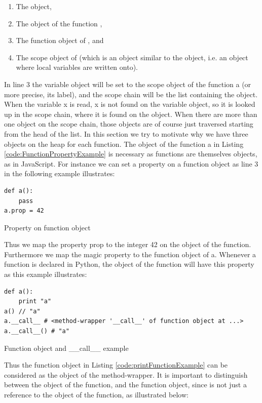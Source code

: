 \begin{enumerate}
  \item The  object,
  \item The object of the function ,
  \item The function object of , and
  \item The scope object of  (which is an object similar to the  object, i.e. an object where local variables are written onto).
\end{enumerate}
In line 3 the variable object will be set to the scope object of the function a (or more precise, its label), and the scope chain will be the list containing the  object. When the variable x is read, x is not found on the variable object, so it is looked up in the scope chain, where it is found on the  object. When there are more than one object on the scope chain, those objects are of course just traversed starting from the head of the list.
In this section we try to motivate why we have three objects on the heap for each function. The object of the function a in Listing \ref{code:FunctionPropertyExample} is necessary as functions are themselves objects, as in JavaScript. For instance we can set a property on a function object as line 3 in the following example illustrates:
\begin{listing}[H]
	\begin{verbatim}
def a():
	pass
a.prop = 42
	\end{verbatim}
\caption{Property on function object}\label{code:FunctionPropertyExample}
\end{listing}
Thus we map the property prop to the integer 42 on the object of the function. Furthermore we map the magic property  to the function object of a. Whenever a function is declared in Python, the object of the function will have this property as this example illustrates:
\begin{listing}[H]
	\begin{verbatim}
def a():
	print "a"
a() // "a"
a.__call__ # <method-wrapper '__call__' of function object at ...> 
a.__call__() # "a"
	\end{verbatim}
\caption{Function object and \_\_call\_\_ example}\label{code:printFunctionExample}
\end{listing}
Thus the function object in Listing \ref{code:printFunctionExample} can be considered as the object of the method-wrapper. It is important to distinguish between the object of the function, and the function object, since  is not just a reference to the object of the function, as illustrated below:
